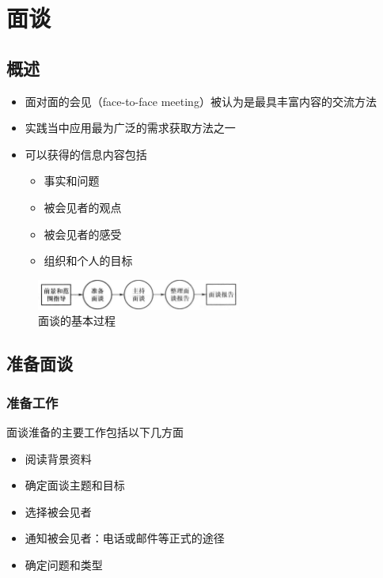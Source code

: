 \section{面谈}

\subsection{概述}
\begin{itemize}
    \item 面对面的会见（face-to-face meeting）被认为是最具丰富内容的交流方法
    \item 实践当中应用最为广泛的需求获取方法之一 
    \item 可以获得的信息内容包括 
    \vspace{-0.8em}
	\begin{multicols}{2}
    \begin{itemize}
        \item 事实和问题 
        \item 被会见者的观点 
        \item 被会见者的感受 
        \item 组织和个人的目标 
    \end{itemize}
	\end{multicols}
\end{itemize}

\begin{figure}[H]
	\centering
	\includegraphics[width=0.6\textwidth]{img/面谈的基本过程.png}
    \caption*{面谈的基本过程}
    \vspace{-1em}
\end{figure}

\subsection{准备面谈}

\subsubsection{准备工作}
面谈淮备的主要工作包括以下几方面
\vspace{-0.8em}
\begin{multicols}{2}
    \begin{itemize}
        \item 阅读背景资料 
        \item 确定面谈主题和目标 
        \item 选择被会见者 
        \item 通知被会见者：电话或邮件等正式的途径 
        \item 确定问题和类型   
    \end{itemize}
\end{multicols}
\vspace{-1em}

